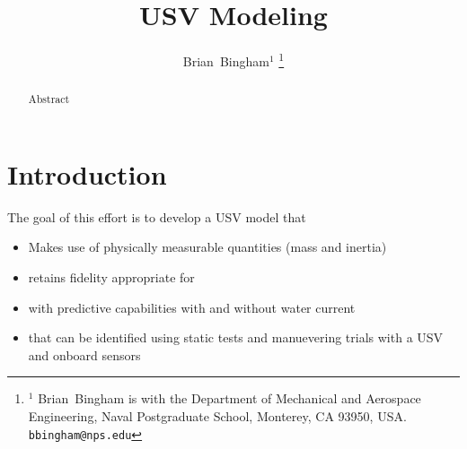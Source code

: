 \documentclass[11pt,draftcls,journal,onecolumn]{../latexlib/latex_ieee/IEEEtran}
\begin{document}
\newtheorem{remark}{Remark}
\renewcommand{\theremark}{\unskip}



%


\newcommand{\SF}{0.2}
\newcommand{\SFb}{0.45}
\newcommand{\SFPic}{0.45}
\newcommand{\SFPlot}{0.45}
\newcommand{\SFc}{0.25}
\newcommand{\FigWidth}{\SFb}

\newcommand{\scaleOneTwo}[2] {\scalebox{#1}}

\graphicspath{{./figs/}}

\title{USV Modeling}

\author{Brian~Bingham$^{1}$%
\thanks{$^{1}$ Brian~Bingham is with the Department of Mechanical and Aerospace Engineering, Naval Postgraduate School, Monterey, CA 93950, USA. {\tt\small bbingham@nps.edu}}%
}

\maketitle

\begin{abstract}
Abstract
\end{abstract}

\IEEEpeerreviewmaketitle

\section{Introduction}
The goal of this effort is to develop a USV model that 
\begin{itemize}
\item Makes use of physically measurable quantities (mass and inertia)
\item retains fidelity appropriate for 
\item with predictive capabilities with and without water current
\item that can be identified using static tests and manuevering trials with a USV and onboard sensors
\end{itemize} 
\end{document}
